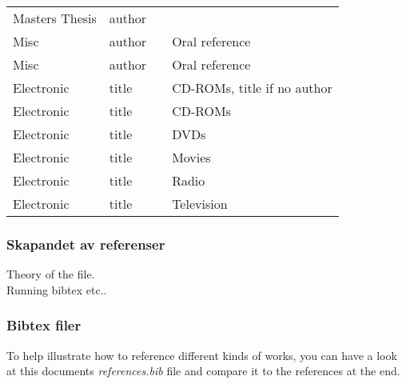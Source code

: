 \begin{table}[h]
\begin{tabular}{l l l l}
Masters Thesis & author & \citet{yf07} \\
Misc           & author & \citet{es01}     & Oral reference \\
Misc           & author & \citet{ks08}     & Oral reference \\
Electronic     & title  & \citet{ea05}     & CD-ROMs, title if no author \\
Electronic     & title  & \citet{ns03}     & CD-ROMs\\
Electronic     & title  & \citet{jp05}     & DVDs\\
Electronic     & title  & \citet{ssh04}    & Movies\\
Electronic     & title  & \citet{fapp09}   & Radio\\
Electronic     & title  & \citet{kn09}     & Television\\
\end{tabular}
\end{table}

\subsubsection{Skapandet av referenser}

Theory of the file. \\
Running bibtex etc..

\subsubsection{Bibtex filer}

To help illustrate how to reference different kinds of works, you can have a look at this documents \emph{references.bib} file and compare it to the references at the end.

